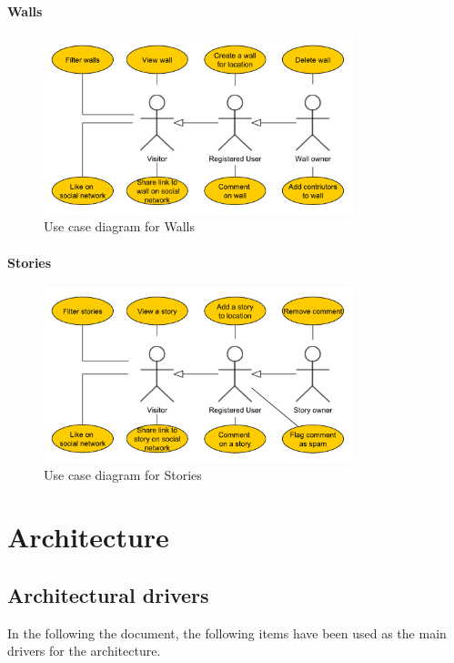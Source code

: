 \documentclass[11pt]{book}
\begin{document}
\subsubsection{Walls}
\begin{figure}[H]
      \centering
      \includegraphics[width=0.8\textwidth]{Figures/Requirements/wall.pdf}
      \caption{Use case diagram for Walls}
      \label{fig:req_usecase_walls}
\end{figure}

\subsubsection{Stories}
\begin{figure}[H]
      \centering
      \includegraphics[width=0.8\textwidth]{Figures/Requirements/story.pdf}
      \caption{Use case diagram for Stories}
      \label{fig:req_usecase_stories}
\end{figure}


\chapter{Architecture}\label{chap:architecture}

\section{Architectural drivers} \label{sec:architecture_drivers}
In the following the document, the following items have been used as the main drivers for the architecture.
\end{document}
